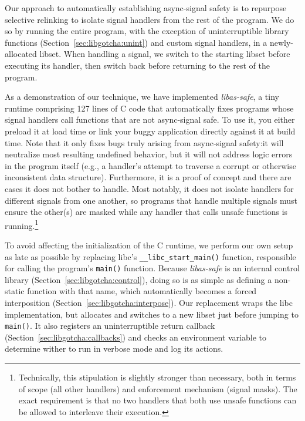 Our approach to automatically establishing async-signal safety is to repurpose
selective relinking to isolate signal handlers from the rest of the program.  We do
so by running the entire program, with the exception of uninterruptible library
functions (Section~\ref{sec:libgotcha:unint}) and custom signal handlers, in a
newly-allocated libset.  When handling a signal, we switch to the starting libset
before executing its handler, then switch back before returning to the rest of
the program.

As a demonstration of our technique, we have implemented \textit{libas-safe}, a tiny
runtime comprising 127 lines of C code that automatically fixes programs whose signal
handlers call functions that are not async-signal safe.  To use it, you either
preload it at load time or link your buggy application directly against it at build
time.  Note that it only fixes bugs truly arising from async-signal safety:\@ it will
neutralize most resulting undefined behavior, but it will not address logic errors in
the program itself (e.g., a handler's attempt to traverse a corrupt or otherwise
inconsistent data structure).  Furthermore, it is a proof of concept and there are
cases it does not bother to handle.  Most notably, it does not isolate handlers for
different signals from one another, so programs that handle multiple signals must
ensure the other(s) are masked while any handler that calls unsafe functions is
running.\footnote{Technically, this stipulation is slightly stronger than necessary,
both in terms of scope (all other handlers) and enforcement mechanism (signal masks).
The exact requirement is that no two handlers that both use unsafe functions can be
allowed to interleave their execution.}

To avoid affecting the initialization of the C runtime, we perform our own setup as
late as possible by replacing libc's \texttt{\_\_libc\_start\_main()} function,
responsible for calling the program's \texttt{main()} function.  Because
\textit{libas-safe} is an internal control library
(Section~\ref{sec:libgotcha:control}), doing so is as simple as defining a
non-static function with that name, which automatically becomes
a forced interposition (Section~\ref{sec:libgotcha:interpose}).  Our replacement
wraps the libc implementation, but allocates and switches to a new libset just before
jumping to \texttt{main()}.  It also registers an uninterruptible return callback
(Section~\ref{sec:libgotcha:callbacks}) and checks an environment variable to
determine wither to run in verbose mode and log its actions.

